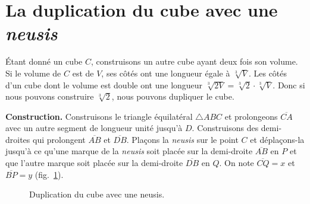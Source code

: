 

\section{La duplication du cube avec une \emph{neusis}}\label{s.neusis-doubling}

Étant donné un cube $C$, construisons un autre cube ayant deux fois son volume. Si le volume de $C$ est de $V$, ses côtés ont une longueur égale à  $\sqrt[3]{V}$. Les côtés d'un cube dont le volume est double ont une longueur $\sqrt[3]{2 V}=\sqrt[3]{2}\cdot\sqrt[3]{V}$. Donc si nous pouvons construire $\sqrt[3]{2}$, nous pouvons dupliquer le cube.

\smallskip

\noindent\textbf{Construction.}
Construisons le triangle équilatéral $\triangle ABC$ et prolongeons $\overline{CA}$ avec un autre segment de longueur unité jusqu'à $D$. Construisons des demi-droites qui prolongent $\overline{AB}$ et $\overline{DB}$. Plaçons  la \emph{neusis} sur le point $C$ et  déplaçons-la jusqu'à ce qu'une marque de la \emph{neusis} soit placée sur la demi-droite $\overline{AB}$ en $P$ et que l'autre marque soit placée sur la demi-droite  $\overline{DB}$ en $Q$. On note $\overline{CQ}=x$ et $\overline{BP}=y$ (fig.~\ref{f.double-neusis}).

\begin{figure}[htbp]
\centering
{}
\caption{Duplication du cube avec une  neusis.}\label{f.double-neusis}
\end{figure}

